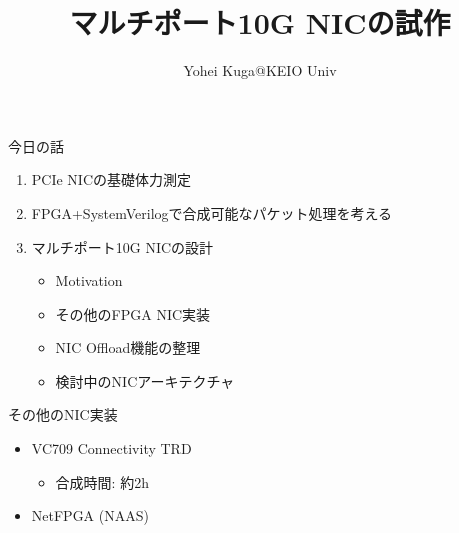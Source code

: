 \documentclass[10pt, compress]{beamer}
\title{マルチポート10G NICの試作}
\subtitle{}
\date[\today]{}
\author{Yohei Kuga@KEIO Univ}
\institute{高速PCルータ研究会 2015/5}
\begin{document}
\maketitle


\begin{frame}[fragile,t]{今日の話}
\begin{enumerate}
\item PCIe NICの基礎体力測定
\item FPGA+SystemVerilogで合成可能なパケット処理を考える
\item マルチポート10G NICの設計
	\begin{itemize}
	\item Motivation
	\item その他のFPGA NIC実装
	\item NIC Offload機能の整理
	\item 検討中のNICアーキテクチャ
	\end{itemize}
\end{enumerate}
\end{frame}


\begin{frame}[fragile,t]{その他のNIC実装}
\begin{itemize}
	\item VC709 Connectivity TRD
	\begin{itemize}
		\item 合成時間: 約2h
	\end{itemize}
	\item NetFPGA (NAAS)
\end{itemize}
\end{frame}

\end{document}
